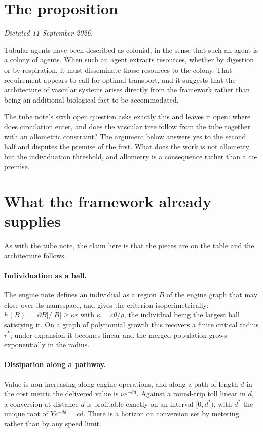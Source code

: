 \documentclass[11pt]{article}
\theoremstyle{plain}
\theoremstyle{definition}
\begin{document}
\section{The proposition}
\label{sec:obs}

\emph{Dictated 11 September 2026.}

Tubular agents have been described as colonial, in the sense that such an agent is a colony of
agents. When such an agent extracts resources, whether by digestion or by respiration, it must
disseminate those resources to the colony. That requirement appears to call for optimal transport,
and it suggests that the architecture of vascular systems arises directly from the framework rather
than being an additional biological fact to be accommodated.

The tube note's sixth open question asks exactly this and leaves it open: where does circulation
enter, and does the vascular tree follow from the tube together with an allometric constraint? The
argument below answers yes to the second half and disputes the premise of the first. What does the
work is not allometry but the individuation threshold, and allometry is a consequence rather than a
co-premise.

\section{What the framework already supplies}
\label{sec:imports}

As with the tube note, the claim here is that the pieces are on the table and the architecture
follows.

\paragraph{Individuation as a ball.} The engine note defines an individual as a region $B$ of the
engine graph that may close over its namespace, and gives the criterion isoperimetrically:
$h(B) = |\partial B| / |B| \geq \kappa r$ with $\kappa = \varepsilon\theta/\rho$, the individual being
the largest ball satisfying it. On a graph of polynomial growth this recovers a finite critical
radius $r^{*}$; under expansion it becomes linear and the merged population grows exponentially in
the radius.

\paragraph{Dissipation along a pathway.} Value is non-increasing along engine operations, and along a
path of length $d$ in the cost metric the delivered value is $\nu e^{-\theta d}$. Against a
round-trip toll linear in $d$, a conversion at distance $d$ is profitable exactly on an interval
$[0, d^{*})$, with $d^{*}$ the unique root of $Y e^{-\theta d} = cd$. There is a horizon on
conversion set by metering rather than by any speed limit.
\end{document}

